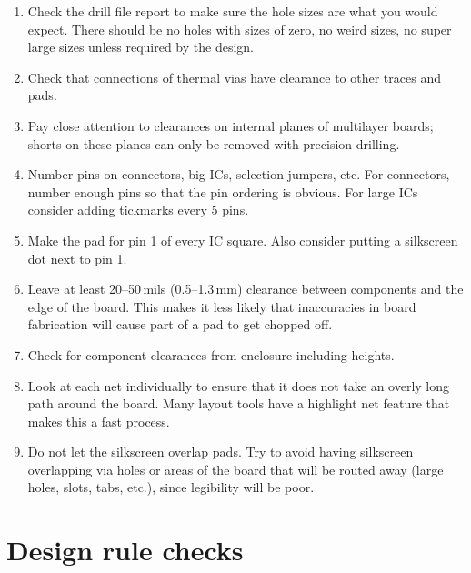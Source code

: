 \begin{enumerate}
\item Check the drill file report to make sure the hole sizes are what
  you would expect. There should be no holes with sizes of zero, no
  weird sizes, no super large sizes unless required by the design.

\item Check that connections of thermal vias have clearance to other
  traces and pads.

\item Pay close attention to clearances on internal planes of
  multilayer boards; shorts on these planes can only be removed with
  precision drilling.

\item Number pins on connectors, big ICs, selection jumpers, etc. For
  connectors, number enough pins so that the pin ordering is
  obvious.  For large ICs consider adding tickmarks every 5 pins.

\item Make the pad for pin 1 of every IC square. Also consider putting
  a silkscreen dot next to pin 1.

\item Leave at least 20--50\,mils (0.5--1.3\,mm) clearance between
  components and the edge of the board. This makes it less likely that
  inaccuracies in board fabrication will cause part of a pad to get
  chopped off.

\item Check for component clearances from enclosure including heights.

\item Look at each net individually to ensure that it does not take an
  overly long path around the board. Many layout tools have a
  highlight net feature that makes this a fast process.

\item Do not let the silkscreen overlap pads. Try to avoid having
  silkscreen overlapping via holes or areas of the board that will be
  routed away (large holes, slots, tabs, etc.), since legibility will
  be poor.

 \end{enumerate}



\section{Design rule checks}


